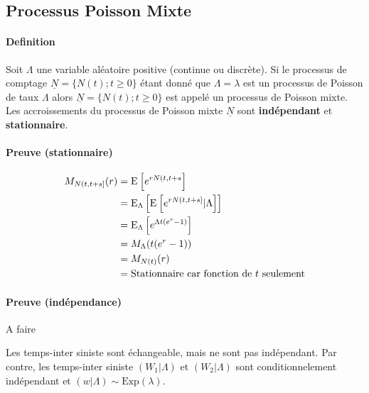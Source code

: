 \subsection{Processus Poisson Mixte}

\paragraph{Definition}
Soit $\Lambda$ une variable aléatoire positive (continue ou discrète). Si le
processus de comptage $\underline{N} = \{N(t);t \geq 0\}$ étant donné que $\Lambda = \lambda$ est
un processus de Poisson de taux $\Lambda$ alors $\underline{N} = \{N(t);t \geq 0\}$ est appelé
un processus de Poisson mixte.  \\ 

Les accroissements du processus de Poisson mixte $\underline{N}$ sont \textbf{indépendant} et \textbf{stationnaire}. \\
\paragraph{Preuve (stationnaire)}
    \begin{align*}
        M_{N(t, t+s]}(r) &= \esp{e^{r N(t, t+s}} \\
                         &= \esp[\Lambda]{\esp{e^{r N(t, t+s]}|\Lambda}} \\
                         &= \esp[\Lambda]{e^{\Lambda t(e^r - 1)}} \\
                         &= M_\Lambda(t(e^r - 1)) \\
                         &= M_{N(t)}(r) \\
                         &= \text{Stationnaire car fonction de $t$ seulement}
    \end{align*}

\paragraph{Preuve (indépendance)}
A faire

\begin{note}
    Les temps-inter siniste sont échangeable, mais ne sont pas indépendant. Par contre,
    les temps-inter siniste $(W_1|\Lambda)$ et $(W_2|\Lambda)$ sont conditionnelement indépendant et $(w|\Lambda) \sim \text{Exp}(\lambda)$. \\
\end{note}

